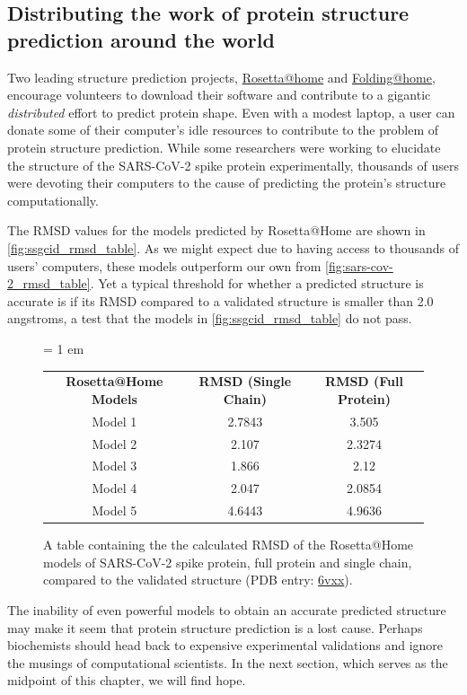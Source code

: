\subsection{Distributing the work of protein structure prediction around the world}

Two leading structure prediction projects, \href{https://boinc.bakerlab.org}{Rosetta@home} and \href{https://foldingathome.org}{Folding@home}, encourage volunteers to download their software and contribute to a gigantic \textit{distributed} effort to predict protein shape. Even with a modest laptop, a user can donate some of their computer's idle resources to contribute to the problem of protein structure prediction. While some researchers were working to elucidate the structure of the SARS-CoV-2 spike protein experimentally, thousands of users were devoting their computers to the cause of predicting the protein's structure computationally.

The RMSD values for the models predicted by Rosetta@Home are shown in \autoref{fig:ssgcid_rmsd_table}. As we might expect due to having access to thousands of users' computers, these models outperform our own from \autoref{fig:sars-cov-2_rmsd_table}. Yet a typical threshold for whether a predicted structure is accurate is if its RMSD compared to a validated structure is smaller than 2.0 angstroms, a test that the models in \autoref{fig:ssgcid_rmsd_table} do not pass.

\begin{figure}[h]
	\centering
	\tabcolsep = 1 em
	\mySfFamily
	\begin{tabular}{c c c}
		\textbf{Rosetta@Home Models} & \textbf{RMSD (Single Chain)} & \textbf{RMSD (Full Protein)}\\
		Model 1  & 2.7843 & 3.505\phantom{x}  \\
		Model 2  & 2.107\phantom{x} & 2.3274 \\
		Model 3  & 1.866\phantom{x} & 2.12\phantom{xx} \\
		Model 4  & 2.047\phantom{x} & 2.0854 \\
		Model 5  & 4.6443 & 4.9636
	\end{tabular}
	\caption{A table containing the the calculated RMSD of the Rosetta@Home models of SARS-CoV-2 spike protein, full protein and single chain, compared to the validated structure (PDB entry: \href{https://www.rcsb.org/structure/6vxx}{6vxx}).}
	\label{fig:ssgcid_rmsd_table}
\end{figure}

The inability of even powerful models to obtain an accurate predicted structure may make it seem that protein structure prediction is a lost cause. Perhaps biochemists should head back to expensive experimental validations and ignore the musings of computational scientists. In the next section, which serves as the midpoint of this chapter, we will find hope.\\

